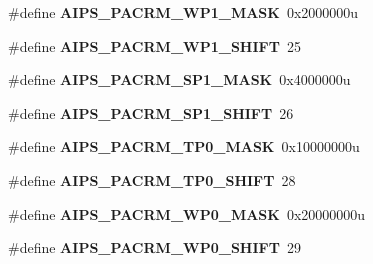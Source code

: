 \begin{DoxyCompactItemize}
\item 
\hypertarget{group___a_i_p_s___register___masks_ga9f25421d89e73f7449650d855a71f812}{}\#define {\bfseries A\+I\+P\+S\+\_\+\+P\+A\+C\+R\+M\+\_\+\+W\+P1\+\_\+\+M\+A\+S\+K}~0x2000000u\label{group___a_i_p_s___register___masks_ga9f25421d89e73f7449650d855a71f812}

\item 
\hypertarget{group___a_i_p_s___register___masks_gad5745b23dd48b7ff19410ee5a1e7d6b7}{}\#define {\bfseries A\+I\+P\+S\+\_\+\+P\+A\+C\+R\+M\+\_\+\+W\+P1\+\_\+\+S\+H\+I\+F\+T}~25\label{group___a_i_p_s___register___masks_gad5745b23dd48b7ff19410ee5a1e7d6b7}

\item 
\hypertarget{group___a_i_p_s___register___masks_ga31b6d5109d958dbc8d34e46e5ab49db2}{}\#define {\bfseries A\+I\+P\+S\+\_\+\+P\+A\+C\+R\+M\+\_\+\+S\+P1\+\_\+\+M\+A\+S\+K}~0x4000000u\label{group___a_i_p_s___register___masks_ga31b6d5109d958dbc8d34e46e5ab49db2}

\item 
\hypertarget{group___a_i_p_s___register___masks_ga8d72f95920b7643efb797ce7c78bd110}{}\#define {\bfseries A\+I\+P\+S\+\_\+\+P\+A\+C\+R\+M\+\_\+\+S\+P1\+\_\+\+S\+H\+I\+F\+T}~26\label{group___a_i_p_s___register___masks_ga8d72f95920b7643efb797ce7c78bd110}

\item 
\hypertarget{group___a_i_p_s___register___masks_gaa7d99491b3e824cf86d22211d28ec36a}{}\#define {\bfseries A\+I\+P\+S\+\_\+\+P\+A\+C\+R\+M\+\_\+\+T\+P0\+\_\+\+M\+A\+S\+K}~0x10000000u\label{group___a_i_p_s___register___masks_gaa7d99491b3e824cf86d22211d28ec36a}

\item 
\hypertarget{group___a_i_p_s___register___masks_gaab4c4798ee2231b2e398cf39674305b6}{}\#define {\bfseries A\+I\+P\+S\+\_\+\+P\+A\+C\+R\+M\+\_\+\+T\+P0\+\_\+\+S\+H\+I\+F\+T}~28\label{group___a_i_p_s___register___masks_gaab4c4798ee2231b2e398cf39674305b6}

\item 
\hypertarget{group___a_i_p_s___register___masks_ga84cec7a6c9667f54a37bba5beb64e032}{}\#define {\bfseries A\+I\+P\+S\+\_\+\+P\+A\+C\+R\+M\+\_\+\+W\+P0\+\_\+\+M\+A\+S\+K}~0x20000000u\label{group___a_i_p_s___register___masks_ga84cec7a6c9667f54a37bba5beb64e032}

\item 
\hypertarget{group___a_i_p_s___register___masks_ga92388c5bbb649738993d066ce8755f2b}{}\#define {\bfseries A\+I\+P\+S\+\_\+\+P\+A\+C\+R\+M\+\_\+\+W\+P0\+\_\+\+S\+H\+I\+F\+T}~29\label{group___a_i_p_s___register___masks_ga92388c5bbb649738993d066ce8755f2b}


\end{DoxyCompactItemize}
